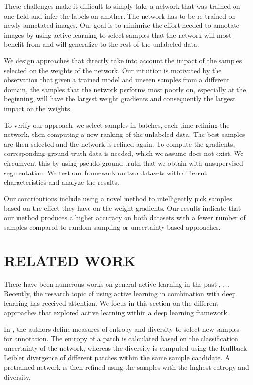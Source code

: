 \documentclass[letterpaper, 10 pt, conference]{ieeeconf}  %
\begin{document}
These challenges make it difficult to simply take a network that was trained on one field and infer the labels on another. The network has to be re-trained on newly annotated images. Our goal is to minimize the effort needed to annotate images by using active learning to select samples that the network will most benefit from and will generalize to the rest of the unlabeled data. 

We design approaches that directly take into account the impact of the samples selected on the weights of the network. Our intuition is motivated by the observation that given a trained model and unseen samples from a different domain, the samples that the network performs most poorly on, especially at the beginning, will have the largest weight gradients and consequently the largest impact on the weights.  

To verify our approach, we select samples in batches, each time refining the network, then computing a new ranking of the unlabeled data. The best samples are then selected and the network is refined again. To compute the gradients, corresponding ground truth data is needed, which we assume does not exist. We circumvent this by using pseudo ground truth that we obtain with unsupervised segmentation. We test our framework on two datasets with different characteristics and analyze the results.

Our contributions include using a novel method to intelligently pick samples based on the effect they have on the weight gradients. Our results indicate that our method produces a higher accuracy on both datasets with a fewer number of samples compared to random sampling or uncertainty based approaches.

\section{RELATED WORK}
\label{sec:related}

There have been numerous works on general active learning in the past \cite{settles2009active}, \cite{guyon2011results}, \cite{holub2008entropy}. Recently, the research topic of using active learning in combination with deep learning has received attention. We focus in this section on the different approaches that explored active learning within a deep learning framework.

In \cite{zhou2017fine}, the authors define measures of entropy and diversity to select new samples for annotation. The entropy of a patch is calculated based on the classification uncertainty of the network, whereas the diversity is computed using the Kullback Leibler divergence of different patches within the same sample candidate. A pretrained network is then refined using the samples with the highest entropy and diversity.
\end{document}
